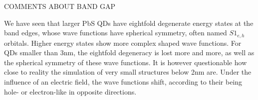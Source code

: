 COMMENTS ABOUT BAND GAP

We have seen that larger PbS QDs have eightfold degenerate energy states at the band edges, whose wave functions have spherical symmetry, often named $S1_{e,h}$ orbitals. Higher energy states show more complex shaped wave functions. For QDs smaller than 3nm, the eightfold degeneracy is lost more and more, as well as the spherical symmetry of these wave functions. It is however questionable how close to reality the simulation of very small structures below 2nm are.
Under the influence of an electric field, the wave functions shift, according to their being hole- or electron-like in opposite directions.


